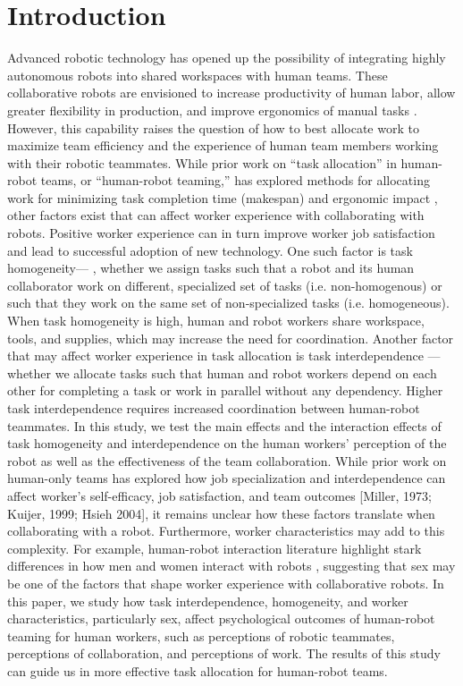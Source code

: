 \section{Introduction}
       Advanced robotic technology has opened up the possibility of integrating highly autonomous robots into shared workspaces with human teams.  These collaborative robots are envisioned to increase productivity of human labor, allow greater flexibility in production, and improve ergonomics of manual tasks \cite{peshkin1999cobots, tan2009human}.  However, this capability raises the question of how to best allocate work to maximize team efficiency and the experience of human team members working with their robotic teammates.
       While prior work on “task allocation” in human-robot teams, or “human-robot teaming,” has explored methods for allocating work for minimizing task completion time (makespan) and ergonomic impact \cite{shah2011improved, gombolay2014decision, tsarouchi2017ijcim}, other factors exist that can affect worker experience with collaborating with robots. Positive worker experience can in turn improve worker job satisfaction and lead to successful adoption of new technology. One such factor is task homogeneity— , whether we assign tasks  such that a robot and its human collaborator work on different, specialized set of tasks (i.e. non-homogenous) or such that they work on the same set of non-specialized tasks (i.e. homogeneous). When task homogeneity is high, human and robot workers share workspace, tools, and supplies, which may increase the need for coordination. Another factor that may affect worker experience in task allocation is task interdependence \cite{kiggundu1983task} — whether we allocate tasks such that human and robot workers depend on each other for completing a task or work in parallel without any dependency. Higher task interdependence requires increased coordination between human-robot teammates.  In this study, we test the main effects and the interaction effects of task homogeneity and interdependence on the human workers’ perception of the robot as well as the effectiveness of the team collaboration. While prior work on human-only teams has explored how job specialization and interdependence can affect worker’s self-efficacy, job satisfaction, and team outcomes [Miller, 1973; Kuijer, 1999; Hsieh 2004], it remains unclear how these factors translate when collaborating with a robot.  Furthermore, worker characteristics may add to this complexity. For example, human-robot interaction literature highlight stark differences in how men and women interact with robots  \cite{schermerhorn2008robot}, suggesting that sex may be one of the factors that shape worker experience with collaborative robots. 
       In this paper, we study how task interdependence, homogeneity, and worker characteristics, particularly sex, affect psychological outcomes of human-robot teaming for human workers, such as perceptions of robotic teammates, perceptions of collaboration, and perceptions of work. The results of this study can guide us in more effective task allocation for human-robot teams.
